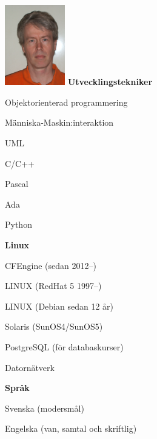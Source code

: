 \documentclass[a4paper,swedish,10pt]{article}
\begin{document}
\begin{minipage}[t]{0.24\textwidth}%
  \raggedleft%
  \vspace{-\topskip+1cm}
  \includegraphics[height=3.5cm]{idbild.jpg}
  \textbf{Utvecklingstekniker}
  \begin{description}[nosep]
    \raggedleft\setlength\itemsep{0.1ex}\small%
  \item Objektorienterad programmering
  \item Människa-Maskin:interaktion
  \item UML
  \item C/C++
  \item Pascal
  \item Ada
  \item Python
  \end{description}
  \vspace{0.5cm}
  \textbf{Linux}
  \begin{description}[nosep,font=\sffamily\bfseries]
    \raggedleft\setlength\itemsep{0.1ex}\small%
  \item CFEngine (sedan 2012--)
  \item LINUX (RedHat 5 1997--)
  \item LINUX (Debian sedan 12 år)
  \item Solaris (SunOS4/SunOS5)
  \item PostgreSQL (för databaskurser)
  \item Datornätverk
  \end{description}
  \vspace{0.5cm}
  \textbf{Språk}
  \begin{description}[nosep,itemsep=0.1ex]
    \raggedleft\small%
  \item Svenska (modersmål)
  \item Engelska (van, samtal och skriftlig)
  \end{description}
\end{minipage}
\end{document}
